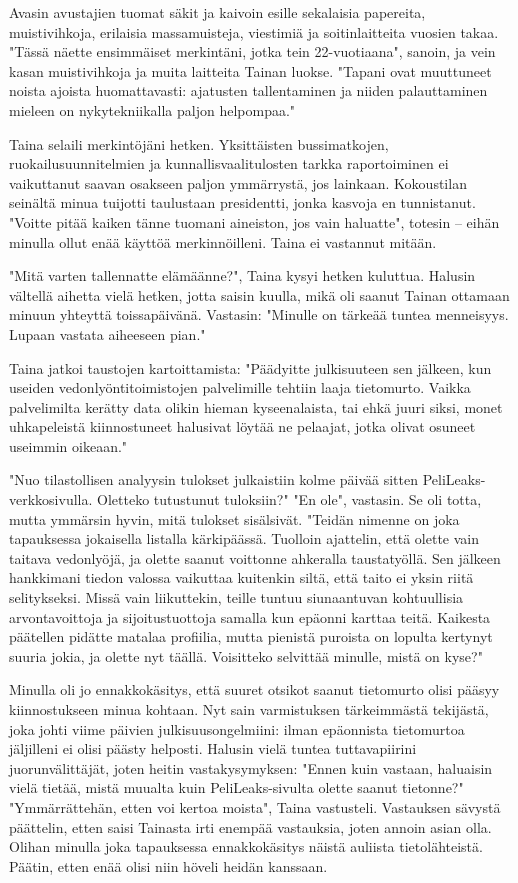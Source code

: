 ﻿\documentclass[a4paper, 12pt, finnish]{article}
\begin{document}
Avasin avustajien tuomat säkit ja kaivoin esille sekalaisia
papereita, muistivihkoja, erilaisia massamuisteja, viestimiä
ja soitinlaitteita vuosien takaa.
"Tässä näette ensimmäiset merkintäni, jotka tein 22-vuotiaana",
sanoin, ja vein kasan muistivihkoja ja muita laitteita Tainan
luokse. "Tapani ovat muuttuneet noista ajoista huomattavasti:
ajatusten tallentaminen ja niiden palauttaminen mieleen on
nykytekniikalla paljon helpompaa."

Taina selaili merkintöjäni hetken. Yksittäisten bussimatkojen,
ruokailusuunnitelmien ja kunnallisvaalitulosten tarkka raportoiminen
ei vaikuttanut saavan osakseen paljon ymmärrystä, jos lainkaan.
Kokoustilan seinältä minua tuijotti taulustaan presidentti,
jonka kasvoja en tunnistanut. "Voitte pitää kaiken tänne
tuomani aineiston, jos vain haluatte", totesin -- eihän minulla
ollut enää käyttöä merkinnöilleni.
Taina ei vastannut mitään.

"Mitä varten tallennatte elämäänne?", Taina kysyi hetken kuluttua.
Halusin vältellä aihetta vielä hetken, jotta saisin kuulla,
mikä oli saanut Tainan ottamaan minuun yhteyttä
toissapäivänä. Vastasin: "Minulle on tärkeää tuntea menneisyys.
Lupaan vastata aiheeseen pian."

Taina jatkoi taustojen kartoittamista: "Päädyitte julkisuuteen
sen jälkeen, kun useiden vedonlyöntitoimistojen palvelimille
tehtiin laaja tietomurto. Vaikka palvelimilta kerätty data olikin
hieman kyseenalaista, tai ehkä juuri siksi, monet uhkapeleistä
kiinnostuneet halusivat löytää ne pelaajat, jotka olivat osuneet
useimmin oikeaan."

"Nuo tilastollisen analyysin tulokset julkaistiin kolme päivää
sitten PeliLeaks-verkkosivulla. Oletteko tutustunut tuloksiin?"
"En ole", vastasin. Se oli totta, mutta ymmärsin hyvin, mitä tulokset sisälsivät.
"Teidän nimenne on joka tapauksessa jokaisella listalla kärkipäässä.
Tuolloin ajattelin, että olette vain taitava vedonlyöjä, ja olette
saanut voittonne ahkeralla taustatyöllä. Sen jälkeen hankkimani
tiedon valossa vaikuttaa kuitenkin siltä, että taito ei yksin riitä
selitykseksi. Missä vain liikuttekin, teille tuntuu siunaantuvan kohtuullisia 
arvontavoittoja ja sijoitustuottoja samalla kun epäonni karttaa teitä.
Kaikesta päätellen pidätte matalaa profiilia, mutta pienistä
puroista on lopulta kertynyt suuria jokia, ja olette nyt täällä.
Voisitteko selvittää minulle, mistä on kyse?"

Minulla oli jo ennakkokäsitys, että suuret otsikot saanut tietomurto
olisi pääsyy kiinnostukseen minua kohtaan. Nyt sain varmistuksen
tärkeimmästä tekijästä, joka johti viime päivien
julkisuusongelmiini: ilman epäonnista tietomurtoa jäljilleni ei olisi
päästy helposti. Halusin vielä tuntea tuttavapiirini
juorunvälittäjät, joten heitin vastakysymyksen:
"Ennen kuin vastaan, haluaisin vielä tietää,
mistä muualta kuin PeliLeaks-sivulta olette saanut tietonne?"
"Ymmärrättehän, etten voi kertoa moista", Taina vastusteli. 
Vastauksen sävystä päättelin, etten saisi Tainasta
irti enempää vastauksia, joten annoin asian olla.
Olihan minulla joka tapauksessa ennakkokäsitys näistä auliista
tietolähteistä. Päätin, etten enää olisi niin höveli heidän kanssaan.
\end{document}
